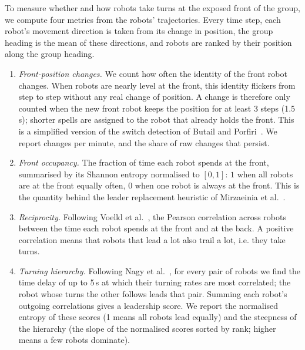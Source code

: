 \documentclass[runningheads]{llncs}
\begin{document}
To measure whether and how robots take turns at the exposed front of the group, we compute four metrics from the robots' trajectories. Every time step,
each robot's movement direction is taken from its change in position, the group heading is the mean of these directions, and robots are ranked by their position along the group heading. 
\begin{enumerate}
\item \emph{Front-position changes.} We count how often the identity of the front robot changes. When robots are nearly level at the front, this identity flickers from step to step without any real change of position. A change is therefore only counted when the new front robot keeps the position for at least 3 steps (1.5\,s); shorter spells are assigned to the robot that already holds the front. This is a simplified version of the switch detection of Butail and Porfiri~\cite{butail2019}. We report changes per minute, and the share of raw changes that persist.
\item \emph{Front occupancy.} The fraction of time each robot spends at the front, summarised by its Shannon entropy normalised to $[0, 1]$: $1$ when all robots are at the front equally often, $0$ when one robot is always at the front. This is the quantity behind the leader replacement heuristic of Mirzaeinia et al.~\cite{Mirzaeinia2019}.
\item \emph{Reciprocity.} Following Voelkl et al.~\cite{voelkl2015}, the Pearson correlation across robots between the time each robot spends at the front and at the back. A positive correlation means that robots that lead a lot also trail a lot, i.e. they take turns.
\item \emph{Turning hierarchy.} Following Nagy et al.~\cite{nagy2010}, for every pair of robots we find the time delay of up to 5\,s at which their turning rates are most correlated; the robot whose turns the other follows leads that pair. Summing each robot's outgoing correlations gives a leadership score. We report the normalised entropy of these scores (1 means all robots lead equally) and the steepness of the hierarchy (the slope of the normalised scores sorted by rank; higher means a few robots dominate).
\end{enumerate}
\end{document}
